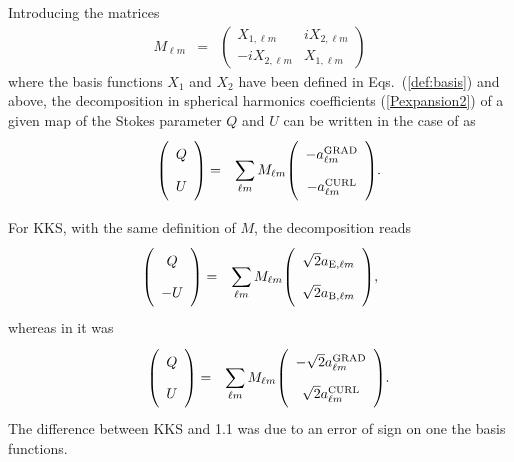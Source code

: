 \documentclass[12pt,twoside]{article}
\newcommand{\myhtmlimage}[1]{ }
\begin{document}
Introducing the matrices 
\begin{eqnarray}
  M_{\ell m} &=& \left( 
  \begin{array}{cc}	X_{1,\ell m}  & i X_{2,\ell m} \\
    -i X_{2,\ell m} & X_{1,\ell m}
  \end{array}
  \right) 
  \myhtmlimage{}
\end{eqnarray}
where the basis functions $X_1$ and $X_2$ have been defined in
Eqs.~(\ref{def:basis}) and above,
the decomposition in spherical harmonics coefficients (\ref{Pexpansion2}) of a
given map of the Stokes parameter
$Q$ and $U$ can be written in the case of  as
\begin{eqnarray}
  \phantom{1.2}\mattwo{Q}{U} &=& \sum_{\ell m} M_{\ell m} \mattwo{-\alm{GRAD}}{-\alm{CURL}}.\myhtmlimage{}\label{QU:12}
\end{eqnarray}

For KKS, with the same definition of $M$, the decomposition reads
\begin{eqnarray}
\mattwo{Q}{-U} &=& \sum_{\ell m} M_{\ell m} \mattwo{\sqrt{2}\azlm{E}}{\sqrt{2}\azlm{B}},
\myhtmlimage{}
\label{QU:KKS}
\end{eqnarray}
%
whereas in  it was
\begin{eqnarray}
\phantom{1.1}\mattwo{Q}{U} &=& \sum_{\ell m} M_{\ell m} \mattwo{-\sqrt{2}\alm{GRAD}}{\sqrt{2}\alm{CURL}}.
\myhtmlimage{}
\label{QU:11}
\end{eqnarray}
The difference between KKS and 1.1 was due to an error of sign on one the basis functions.


\end{document}
